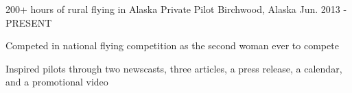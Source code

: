 \begin{cventries}



\cventry
{200+ hours of rural flying in Alaska} %
{Private Pilot} %
{Birchwood, Alaska} %
{Jun. 2013 - PRESENT} %
{ %
\begin{cvitems}
\item {Competed in national flying competition as the second woman ever to compete}
\item {Inspired pilots through two newscasts, three articles, a press release, a calendar, and a promotional video}
\end{cvitems}
}


\end{cventries}